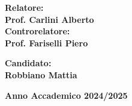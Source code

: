 \begin{titlepage}
\noindent
\begin{minipage}[t]{0.47\textwidth}
{\large{\bf Relatore:\\
Prof. Carlini Alberto}}
\vspace{8mm}
{\large{\bf \\ Controrelatore:\\
Prof. Fariselli Piero}}
\end{minipage}
\hfill
\begin{minipage}[t]{0.47\textwidth}\raggedleft
\vspace{20mm}
{\large{\bf Candidato:\\
Robbiano Mattia}}
\end{minipage}
\vspace{10mm}
\begin{center}
{\large{\bf 
Anno Accademico 2024/2025}}
\end{center}

\end{titlepage}